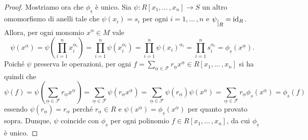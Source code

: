 \documentclass{article}
\theoremstyle{definition}
\newcommand{\valpha}{\underline{\alpha}}
\begin{document}
\begin{proof}
\vspace{2mm}

\noindent Mostriamo ora che $\phi_{\underline{s}}$ è unico. Sia $\psi\colon R[x_1,...\,,x_n]\to S$ un altro omomorfismo di anelli tale che $\psi(x_i)=s_i$ per ogni $i=1,...\,,n$ e $\psi \raisebox{-.5em}{$\vert_{R}$}= \operatorname{id}_R.$ Allora, per ogni monomio $x^{\valpha}\in M$ vale $$\psi(x^{\valpha})=\psi\left(\prod\limits_{i=1}^n x_i^{\alpha_i}\right)=\prod\limits_{i=1}^n \psi\left(x_i^{\alpha_i}\right)=\prod\limits_{i=1}^n \psi(x_i)^{\alpha_i}=\prod\limits_{i=1}^n s_i^{\alpha_i}=\phi_{\underline{s}}(x^{\valpha}).$$ Poiché $\psi$ preserva le operazioni, per ogni $f=\sum\limits_{\valpha\in \mathcal{F}} r_{\valpha}x^{\valpha}\in R[x_1,...\,,x_n]$ si ha quindi che \[ \psi(f)=\psi\left(\sum\limits_{\valpha\in \mathcal{F}} r_{\valpha}x^{\valpha}\right)=\sum\limits_{\valpha\in \mathcal{F}} \psi(r_{\valpha}x^{\valpha})=\sum\limits_{\valpha\in \mathcal{F}} \psi(r_{\valpha})\psi(x^{\valpha})=\sum\limits_{\valpha\in \mathcal{F}} r_{\valpha}\phi_{\underline{s}}(x^{\valpha})=\phi_{\underline{s}}(f)\] essendo $\psi(r_{\valpha})=r_{\valpha}$ perché $r_{\valpha}\in R$ e $\psi(x^{\valpha})=\phi_{\underline{s}}(x^{\valpha})$ per quanto provato sopra. Dunque, $\psi$ coincide con $\phi_{\underline{s}}$ per ogni polinomio $f\in R[x_1,...\,,x_n]$, da cui $\phi_{\underline{s}}$ è unico.\end{proof}
\end{document}
